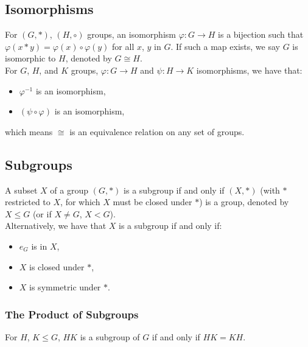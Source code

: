 \subsection{Isomorphisms}

For $(G, \ast)$, $(H, \circ)$ groups, an isomorphism $\varphi : G \to H$ is a
bijection such that $\varphi(x \ast y) = \varphi(x) \circ \varphi(y)$ for all
$x$, $y$ in $G$. If such a map exists, we say $G$ is isomorphic to $H$, denoted
by $G \cong H$.
\\[\baselineskip]
For $G$, $H$, and $K$ groups, $\varphi : G \to H$ and $\psi : H \to K$ isomorphisms,
we have that: \begin{itemize}
    \item $\varphi^{-1}$ is an isomorphism,
    \item $(\psi \circ \varphi)$ is an isomorphism,
\end{itemize} which means $\cong$ is an equivalence relation on any set of groups.

\subsection{Subgroups}

A subset $X$ of a group $(G, \ast)$ is a subgroup if and only if $(X, \ast)$
(with $\ast$ restricted to $X$, for which $X$ must be closed under $\ast$) 
is a group, denoted by $X \leq G$ (or if $X \neq G$, $X < G$).
\\[\baselineskip]
Alternatively, we have that $X$ is a subgroup if and only if: \begin{itemize}
    \item $e_G$ is in $X$,
    \item $X$ is closed under $\ast$,
    \item $X$ is symmetric under $\ast$.
\end{itemize}

\subsubsection{The Product of Subgroups}

For $H$, $K \leq G$, $HK$ is a subgroup of $G$ if and only if $HK = KH$.

